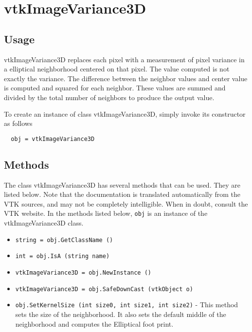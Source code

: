 \section{vtkImageVariance3D}

\subsection{Usage}

 vtkImageVariance3D replaces each pixel with a measurement of 
 pixel variance in a elliptical neighborhood centered on that pixel.
 The value computed is not exactly the variance.
 The difference between the neighbor values and center value is computed
 and squared for each neighbor.  These values are summed and divided by
 the total number of neighbors to produce the output value.

To create an instance of class vtkImageVariance3D, simply
invoke its constructor as follows
\begin{verbatim}
  obj = vtkImageVariance3D
\end{verbatim}
\subsection{Methods}

The class vtkImageVariance3D has several methods that can be used.
  They are listed below.
Note that the documentation is translated automatically from the VTK sources,
and may not be completely intelligible.  When in doubt, consult the VTK website.
In the methods listed below, \verb|obj| is an instance of the vtkImageVariance3D class.
\begin{itemize}
\item  \verb|string = obj.GetClassName ()|

\item  \verb|int = obj.IsA (string name)|

\item  \verb|vtkImageVariance3D = obj.NewInstance ()|

\item  \verb|vtkImageVariance3D = obj.SafeDownCast (vtkObject o)|

\item  \verb|obj.SetKernelSize (int size0, int size1, int size2)| -  This method sets the size of the neighborhood.  It also sets the default
 middle of the neighborhood and computes the Elliptical foot print.

\end{itemize}
